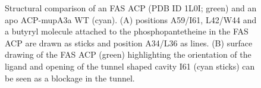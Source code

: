 		\setlength\fboxsep{5pt}
		\setlength\fboxrule{1.5pt}
		\begin{figure}[htbp]
		\centering
		\caption[Structural comparison of an FAS ACP (PDB ID 1L0I) and an apo ACP-mupA3a WT.]{Structural comparison of an FAS ACP (PDB ID 1L0I; green) and an apo ACP-mupA3a WT (cyan). (A) positions A59/I61, L42/W44 and a butyryl molecule attached to the phosphopantetheine in the FAS ACP are drawn as sticks and position A34/L36 as lines. (B) surface drawing of the FAS ACP (green) highlighting the orientation of the ligand and opening of the tunnel shaped cavity I61 (cyan sticks) can be seen as a blockage in the tunnel.}
		\label{fig:pks_fas_comp}
		\end{figure}	
	
